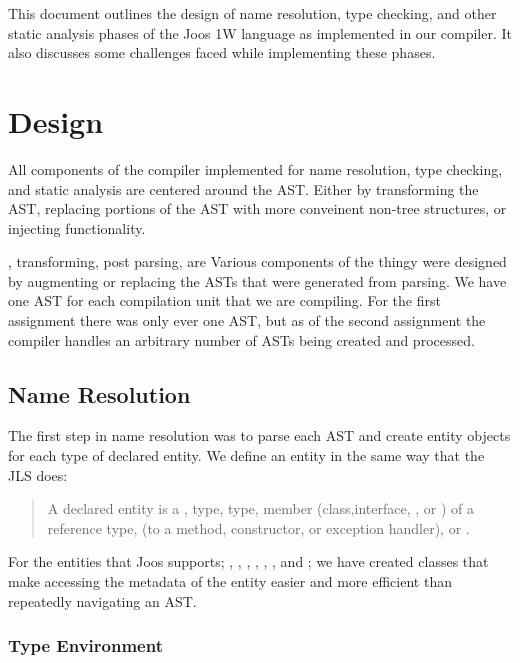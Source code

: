 \documentclass[pdftex,11pt,a4paper]{article}
\begin{document}

This document outlines the design of name resolution, type checking,
and other static analysis phases of the Joos 1W language as
implemented in our compiler. It also discusses some challenges faced
while implementing these phases.


\section{Design}

All components of the compiler implemented for name resolution, type
checking, and static analysis are centered around the AST. Either by
transforming the AST, replacing portions of the AST with more
conveinent non-tree structures, or injecting functionality.


, transforming, post parsing, are Various components of the thingy were designed by augmenting or
replacing the ASTs that were generated from parsing. We have one AST
for each compilation unit that we are compiling. For the first
assignment there was only ever one AST, but as of the second
assignment the compiler handles an arbitrary number of ASTs being
created and processed.

\subsection{Name Resolution}

The first step in name resolution was to parse each AST and create
entity objects for each type of declared entity. We define an entity
in the same way that the JLS does:

\begin{quote}
A declared entity is a ,  type,
 type, member (class,interface, , or
) of a reference type,  (to a method,
constructor, or exception handler), or .
\end{quote}

For the entities that Joos supports; , ,
, , , , and
; we have created classes that make accessing the
metadata of the entity easier and more efficient than repeatedly
navigating an AST.


\subsubsection{Type Environment}
\end{document}
